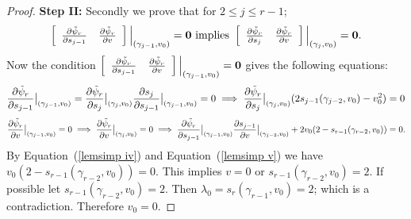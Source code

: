 \documentclass[10pt,twoside]{amsart}
\theoremstyle{definition}
\theoremstyle{definition}
\begin{document}
\begin{proof}
    
\textbf{Step II:} Secondly we prove that for $2\leq j\leq r-1$; 
\begin{eqnarray*}
\left[\begin{array}{ccc}
\frac{\partial\Tilde{\psi}_r}{\partial s_{j-1}} & \frac{\partial\Tilde{\psi}_r}{\partial v}  \end{array}\right]\Big |_{(\gamma_{j-1},v_0)}=\mathbf{0}\  \text{implies}\  \left[\begin{array}{ccc}
    \frac{\partial\Tilde{\psi}_r}{\partial s_j} & \frac{\partial\Tilde{\psi}_r}{\partial v}  \end{array}\right]\Big |_{(\gamma_j,v_0)}=\mathbf{0}.
     \end{eqnarray*}
Now the condition $\left[\begin{array}{ccc}
    \frac{\partial\Tilde{\psi}_r}{\partial s_{j-1}} & \frac{\partial\Tilde{\psi}_r}{\partial v}  \end{array}\right]\Big |_{(\gamma_{j-1},v_0)}=\mathbf{0}$
    gives the following equations:
    \begin{equation}{\label{lemsimp iv}}
    \frac{\partial\Tilde{\psi}_r}{\partial s_{j-1}}\big |_{(\gamma_{j-1},v_0)}=\frac{\partial\Tilde{\psi}_r}{\partial s_{j}}\big |_{(\gamma_j,v_0)}\frac{\partial s_{j}}{\partial s_{j-1}}\big |_{(\gamma_{j-1},v_0)}=0\implies \frac{\partial\Tilde{\psi}_r}{\partial s_{j}}\big |_{(\gamma_j,v_0)}(2s_{j-1}(\gamma_{j-2},v_0)-v_0^2)=0
  \end{equation}
\begin{equation}{\label{lemsimp v}}
\frac{\partial\Tilde{\psi}_r}{\partial v}\big |_{(\gamma_{j-1},v_0)} =0\implies \frac{\partial\Tilde{\psi}_r}{\partial v}\big |_{(\gamma_{j},v_0)}=0\implies\frac{\partial\Tilde{\psi}_r}{\partial s_{j-1}}\big|_{(\gamma_{j-1},v_0)}\frac{\partial s_{j-1}}{\partial v}\big|_{(\gamma_{j-2},v_0)}+ 2v_0(2-s_{r-1}(\gamma_{r-2},v_0))=0.
\end{equation}
By Equation~(\ref{lemsimp iv}) and Equation~(\ref{lemsimp v}) we have $v_0(2-s_{r-1}(\gamma_{r-2},v_0))=0$. This implies $v=0$ or $s_{r-1}(\gamma_{r-2},v_0)=2$. If possible let  $s_{r-1}(\gamma_{r-2},v_0)=2$. Then $\lambda_0=s_r(\gamma_{r-1},v_0)=2$; which is a contradiction. Therefore $v_0=0$. 
 

\end{proof}
\end{document}
